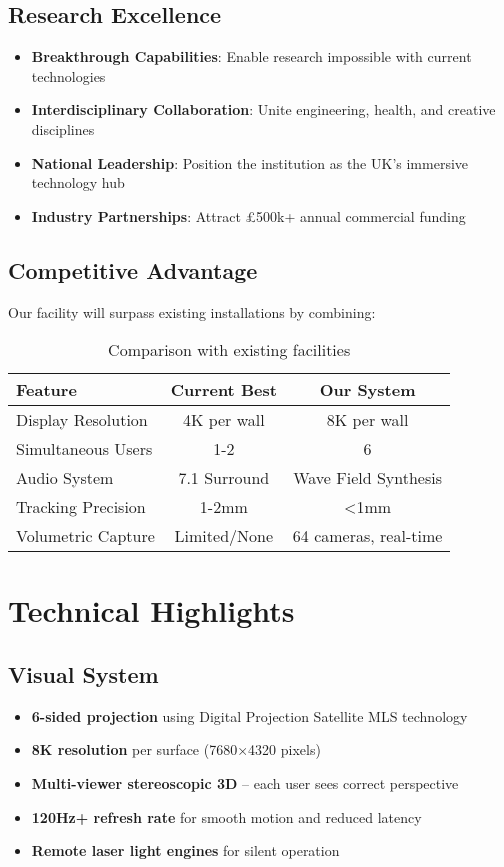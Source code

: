 \subsection*{Research Excellence}
\begin{itemize}[leftmargin=*]
    \item \textbf{Breakthrough Capabilities}: Enable research impossible with current technologies
    \item \textbf{Interdisciplinary Collaboration}: Unite engineering, health, and creative disciplines
    \item \textbf{National Leadership}: Position the institution as the UK's immersive technology hub
    \item \textbf{Industry Partnerships}: Attract £500k+ annual commercial funding
\end{itemize}

\subsection*{Competitive Advantage}

Our facility will surpass existing installations by combining:

\begin{table}[H]
\centering
\begin{tabular}{@{}lcc@{}}
\toprule
\textbf{Feature} & \textbf{Current Best} & \textbf{Our System} \\
\midrule
Display Resolution & 4K per wall & 8K per wall \\
Simultaneous Users & 1-2 & 6 \\
Audio System & 7.1 Surround & Wave Field Synthesis \\
Tracking Precision & 1-2mm & <1mm \\
Volumetric Capture & Limited/None & 64 cameras, real-time \\
\bottomrule
\end{tabular}
\caption{Comparison with existing facilities}
\end{table}

\section*{Technical Highlights}

\subsection*{Visual System}
\begin{itemize}
    \item \textbf{6-sided projection} using Digital Projection Satellite MLS technology
    \item \textbf{8K resolution} per surface (7680×4320 pixels)
    \item \textbf{Multi-viewer stereoscopic 3D} – each user sees correct perspective
    \item \textbf{120Hz+ refresh rate} for smooth motion and reduced latency
    \item \textbf{Remote laser light engines} for silent operation
\end{itemize}

